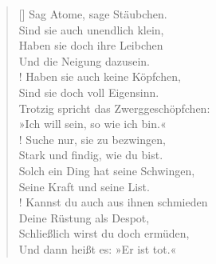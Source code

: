\settowidth{\versewidth}{Trotzig spricht das Zwerggeschöpfchen:}
\begin{verse}[\versewidth]
Sag Atome, sage Stäubchen.\\
Sind sie auch unendlich klein,\\
Haben sie doch ihre Leibchen\\
Und die Neigung dazusein.\\!
Haben sie auch keine Köpfchen,\\
Sind sie doch voll Eigensinn.\\
Trotzig spricht das Zwerggeschöpfchen:\\
»Ich will sein, so wie ich bin.«\\!
Suche nur, sie zu bezwingen,\\
Stark und findig, wie du bist.\\
Solch ein Ding hat seine Schwingen,\\
Seine Kraft und seine List.\\!
Kannst du auch aus ihnen schmieden\\
Deine Rüstung als Despot,\\
Schließlich wirst du doch ermüden,\\
Und dann heißt es: »Er ist tot.«\\
\end{verse}
